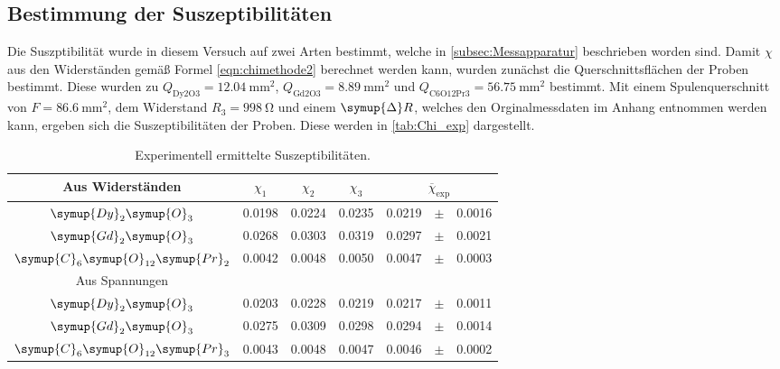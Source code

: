 \subsection{Bestimmung der Suszeptibilitäten}
\label{subsec:A_Suszep}
Die Suszptibilität wurde in diesem Versuch auf zwei Arten bestimmt, welche in \autoref{subsec:Messapparatur} beschrieben worden sind. Damit $\chi$ aus den Widerständen gemäß
Formel \eqref{eqn:chimethode2} berechnet werden kann, wurden zunächst die Querschnittsflächen der Proben bestimmt. Diese wurden zu 
$Q_{\text{Dy2O3}} = \qty{12.04}{\milli\metre\squared}$, $Q_{\text{Gd2O3}} = \qty{8.89}{\milli\metre\squared}$ und $Q_{\text{C6O12Pr3}} = \qty{56.75}{\milli\metre\squared}$
bestimmt. Mit einem Spulenquerschnitt von $F = \qty{86,6}{\milli\metre\squared}$, dem Widerstand $R_3 = \qty{998}{\ohm}$ und einem $\symup{\Delta}R$, welches den Orginalmessdaten 
im Anhang entnommen werden kann, ergeben sich die Suszeptibilitäten der Proben. Diese werden in \autoref{tab:Chi_exp} dargestellt.
\begin{table}
  \centering
  \caption{Experimentell ermittelte Suszeptibilitäten.}
  \label{tab:Chi_exp}
  \begin{tabular}{c S[table-format = 1.4] S S r c l}
    \toprule
      {Aus Widerständen} & {$\chi_1$} & {$\chi_2$} & {$\chi_3$} &
        \\
    \midrule
      {$\symup{Dy}_2\symup{O}_3$}                 & 0.0198 & 0.0224 & 0.0235 & 0.0219 & {$\pm$} & 0.0016 \\
      {$\symup{Gd}_2\symup{O}_3$}                 & 0.0268 & 0.0303 & 0.0319 & 0.0297 & {$\pm$} & 0.0021 \\
      {$\symup{C}_6\symup{O}_{12}\symup{Pr}_2$}   & 0.0042 & 0.0048 & 0.0050 & 0.0047 & {$\pm$} & 0.0003 \\
    \bottomrule
      {Aus Spannungen} & & & & & \\
    \bottomrule 
      {$\symup{Dy}_2\symup{O}_3$}                 & 0.0203 & 0.0228 & 0.0219 & 0.0217 & {$\pm$} & 0.0011 \\
      {$\symup{Gd}_2\symup{O}_3$}                 & 0.0275 & 0.0309 & 0.0298 & 0.0294 & {$\pm$} & 0.0014 \\
      {$\symup{C}_6\symup{O}_{12}\symup{Pr}_3$}   & 0.0043 & 0.0048 & 0.0047 & 0.0046 & {$\pm$} & 0.0002 \\
    \bottomrule 
  \end{tabular}
\end{table}

